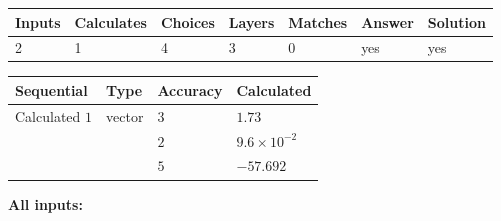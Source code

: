 \documentclass[12pt]{article}
\begin{document}
 
 
\noindent{}
 
 

 
 
\vspace{0.3in}
   
   
   
   
\noindent\begin{tabular}{|l|l|l|l|l|l|l|}
 \hline
Inputs & Calculates & Choices & Layers & Matches & Answer & Solution \\ \hline
           2  & 
           1  & 
           4
  & 
           3  & 
           0  & 
  yes & 
  yes 
  \\ \hline
 \end{tabular}
   
   
   
   
\noindent{}
   
   
  
  
\noindent\begin{tabular}{|l|l|l|l|}
\hline
 Sequential & Type & Accuracy & Calculated \\ 
\hline
 
 
  Calculated $            1 $ & vector &  
  $            3  $ 
 &  $ 1.73 $ 
 \\    
  & & 
  $            2  $ 
 &  $ 9.6 \times 10^{-2} $ 
 \\    
  & & 
  $            5  $ 
 &  $ -57.692 $ 
 \\  \hline  
 \end{tabular}
   
   
   
   
\noindent\vspace{0.1in}\hspace{-0.08in} {\textbf{\Large{All inputs: }}}
   
   
  
\end{document}
